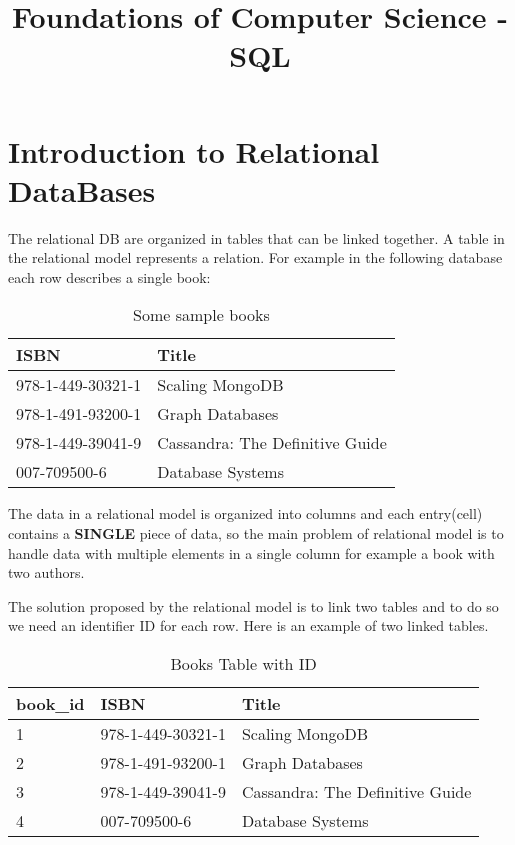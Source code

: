 \documentclass[a4page, 11pt]{article}
\title{Foundations of Computer Science  - SQL}
\author{}
\date{}
\begin{document}
\maketitle

\section{Introduction to Relational DataBases}

The relational DB are organized in tables that can be linked together. A table in the relational model represents a relation. For example in the following database each row describes a single book:

\begin{table}[h]
	\centering
	\begin{tabular}{|l|l|}
		\hline
		
		\textbf{ISBN} & \textbf{Title}\\ 
		\hline
		978-1-449-30321-1 & Scaling MongoDB\\ 
		\hline
		978-1-491-93200-1 & Graph Databases\\ 
		\hline
		978-1-449-39041-9 & Cassandra: The Definitive Guide\\ 
		\hline
		007-709500-6 & Database Systems\\
		\hline
		
	\end{tabular}
	\caption{Some sample books}
\end{table}

The data in a relational model is organized into columns and each entry(cell) contains a \textbf{SINGLE} piece of data, so the main problem of relational model is to handle data with multiple elements in a single column for example a book with two authors.

The solution proposed by the relational model is to link two tables and to do so we need an identifier ID for each row.
Here is an example of two linked tables.

\begin{table}[h]
	\centering
	\begin{tabular}{|l|l|l|}
		\hline
		
		\textbf{book\_id} & \textbf{ISBN} & \textbf{Title}\\ 
		\hline
		1 & 978-1-449-30321-1 & Scaling MongoDB\\ 
		\hline
		2 & 978-1-491-93200-1 & Graph Databases\\ 
		\hline
		3 & 978-1-449-39041-9 & Cassandra: The Definitive Guide\\ 
		\hline
		4 & 007-709500-6 & Database Systems\\
		\hline
		
	\end{tabular}
	\caption{Books Table with ID}
\end{table}
\end{document}
